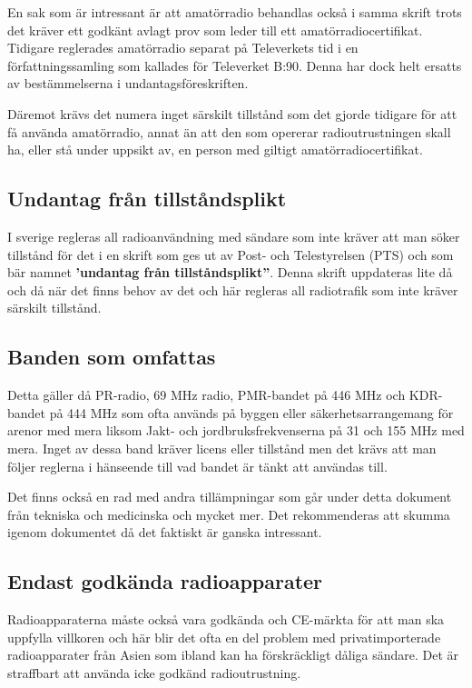 En sak som är intressant är att amatörradio behandlas också i samma skrift
trots det kräver ett godkänt avlagt prov som leder till ett
amatörradiocertifikat. Tidigare reglerades amatörradio separat på Televerkets
tid i en författningssamling som kallades för Televerket B:90. Denna har dock
helt ersatts av bestämmelserna i undantagsföreskriften.

Däremot krävs det numera inget särskilt tillstånd som det gjorde tidigare för
att få använda amatörradio, annat än att den som opererar radioutrustningen
skall ha, eller stå under uppsikt av, en person med giltigt
amatörradiocertifikat.

\subsection{Undantag från tillståndsplikt}

I sverige regleras all radioanvändning med sändare som inte kräver att man
söker tillstånd för det i en skrift som ges ut av Post- och Telestyrelsen
(PTS) och som bär namnet {\bf 'undantag från tillståndsplikt''}. Denna skrift
uppdateras lite då och då när det finns behov av det och här regleras all
radiotrafik som inte kräver särskilt tillstånd.

\subsection{Banden som omfattas}

Detta gäller då PR-radio, 69 MHz radio, PMR-bandet på 446 MHz och KDR-bandet
på 444 MHz som ofta används på byggen eller säkerhetsarrangemang för arenor
med mera liksom Jakt- och jordbruksfrekvenserna på 31 och 155 MHz med mera.
Inget av dessa band kräver licens eller tillstånd men det krävs att man följer
reglerna i hänseende till vad bandet är tänkt att användas till.

Det finns också en rad med andra tillämpningar som går under detta dokument från
tekniska och medicinska och mycket mer. Det rekommenderas att skumma igenom
dokumentet då det faktiskt är ganska intressant.

\subsection{Endast godkända radioapparater}

Radioapparaterna måste också vara godkända och CE-märkta för att man ska
uppfylla villkoren och här blir det ofta en del problem med privatimporterade
radioapparater från Asien som ibland kan ha förskräckligt dåliga sändare. Det
är straffbart att använda icke godkänd radioutrustning.

